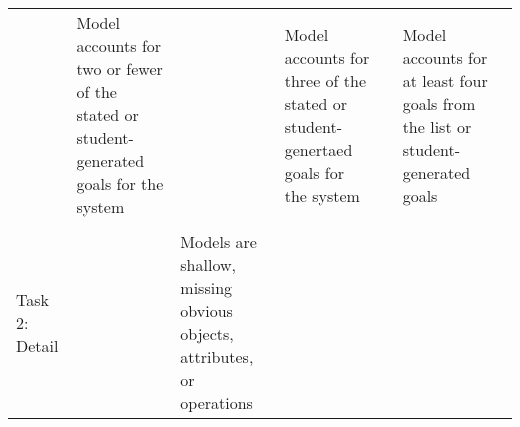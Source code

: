 \documentclass[]{article}
\begin{document}
\begin{longtable}[]{@{}lllllll@{}}
\begin{minipage}[t]{0.03\columnwidth}
\strut
\end{minipage} & \begin{minipage}[t]{0.16\columnwidth}\raggedright
Model accounts for two or fewer of the stated or student-generated goals
for the system\strut
\end{minipage} & \begin{minipage}[t]{0.03\columnwidth}\raggedright
\strut
\end{minipage} & \begin{minipage}[t]{0.19\columnwidth}\raggedright
Model accounts for three of the stated or student-genertaed goals for
the system\strut
\end{minipage} & \begin{minipage}[t]{0.03\columnwidth}\raggedright
\strut
\end{minipage} & \begin{minipage}[t]{0.20\columnwidth}\raggedright
Model accounts for at least four goals from the list or
student-generated goals\strut
\end{minipage}\tabularnewline
\begin{minipage}[t]{0.19\columnwidth}\raggedright
\strut
\end{minipage} & \begin{minipage}[t]{0.03\columnwidth}\raggedright
\strut
\end{minipage} & \begin{minipage}[t]{0.16\columnwidth}\raggedright
\strut
\end{minipage} & \begin{minipage}[t]{0.03\columnwidth}\raggedright
\strut
\end{minipage} & \begin{minipage}[t]{0.19\columnwidth}\raggedright
\strut
\end{minipage} & \begin{minipage}[t]{0.03\columnwidth}\raggedright
\strut
\end{minipage} & \begin{minipage}[t]{0.20\columnwidth}\raggedright
\strut
\end{minipage}\tabularnewline
\begin{minipage}[t]{0.19\columnwidth}\raggedright
Task 2: Detail\strut
\end{minipage} & \begin{minipage}[t]{0.03\columnwidth}\raggedright
\strut
\end{minipage} & \begin{minipage}[t]{0.16\columnwidth}\raggedright
Models are shallow, missing obvious objects, attributes, or operations

\end{minipage}
\end{longtable}
\end{document}
